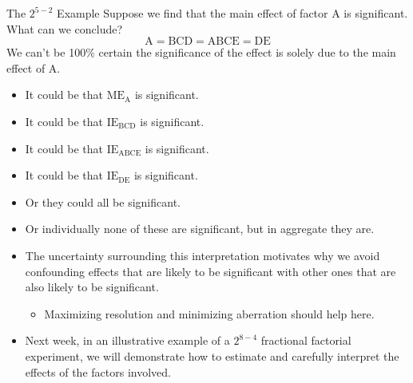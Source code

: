 \begin{itemize}
\begin{Example}{The $ 2^{5-2} $ Example}{}
              Suppose we find that the main effect of factor A is significant. What can we conclude?
              \[ \text{A}=\text{BCD}=\text{ABCE}=\text{DE} \]
              We can't be 100\% certain the significance of the effect is solely due to the main effect of A.
              \begin{itemize}[\bullet]
                  \item It could be that $ \text{ME}_\text{A} $ is significant.
                  \item It could be that $ \text{IE}_\text{BCD} $ is significant.
                  \item It could be that $ \text{IE}_\text{ABCE} $ is significant.
                  \item It could be that $ \text{IE}_\text{DE} $ is significant.
                  \item Or they could all be significant.
                  \item Or individually none of these are significant, but in aggregate they are.
              \end{itemize}
          \end{Example}
\end{itemize}
\begin{itemize}[*]
    \item The uncertainty surrounding this interpretation motivates why we avoid confounding effects that are
          likely to be significant with other ones that are also likely to be significant.
          \begin{itemize}[$\hookrightarrow$]
              \item Maximizing resolution and minimizing aberration should help here.
          \end{itemize}
    \item Next week, in an illustrative example of a $ 2^{8-4} $ fractional factorial experiment, we will demonstrate
          how to estimate and carefully interpret the effects of the factors involved.
\end{itemize}
